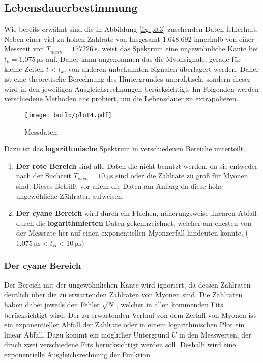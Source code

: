 \subsection{Lebensdauerbestimmung}
Wie bereits erwähnt sind die in Abbildung \eqref{fig:plt3} zusehenden Daten fehlerhaft. 
Neben einer viel zu hohen Zahlrate von Insgesamt $1.648.692$ innerhalb von einer Messzeit von $T_{mess}=\qty{157226}{\s}$,
weist das Spektrum eine ungewöhnliche Kante bei $t_k=\qty{1.075}{\us}$ auf.
Daher kann angenommen das die Myonsignale, gerade für kleine Zeiten $t<t_k$, von anderen unbekannten Signalen überlagert werden. 
Daher ist eine theoretische Berechnung des Hintergrundes unpraktisch, sondern dieser wird in den jeweiligen Ausgleichsrechnungen berücksichtigt. 
Im Folgenden werden verschiedene Methoden aus probiert, um die Lebensdauer zu extrapolieren. 
 
\begin{figure}[H]
	\centering
	\texttt{[image: build/plot4.pdf]}
	\caption{Messdaten}\label{fig:plt4}
\end{figure}

Dazu ist das \textbf{logarithmische} Spektrum in verschiedenen Bereiche unterteilt. 

\begin{enumerate}
	\item \textbf{Der rote Bereich} sind alle Daten die nicht benutzt werden, da sie entweder nach der Suchzeit $T_{such}=\qty{10}{\us}$ sind 
	oder die Zählrate zu groß für Myonen sind. Dieses Betrifft vor allem die Daten am Anfang da diese hohe ungewöhliche Zählraten aufweisen.
	\item \textbf{Der cyane Bereich} wird durch ein Flachen, näherungsweise linearen Abfall durch die \textbf{logarithmierten} Daten gekennzeichnet, 
	welcher am ehesten von der Messrate her auf einen exponentiellen Myonzerfall hindeuten könnte. ($\qty{1.075}{\us}<t_B<\qty{10}{\us}$)
\end{enumerate}

\subsubsection{Der cyane Bereich}
Der Bereich mit der ungewöhnlichen Kante wird ignoriert, da dessen Zählraten deutlich über die zu erwartenden Zahlraten von Myonen sind. 
Die Zählraten haben dabei jeweils den Fehler $\sqrt{N\,}$, welcher in allen kommenden Fits berücksichtigt wird. 
Der zu erwartenden Verlauf von dem Zerfall von Myonen ist ein exponentieller Abfall der Zahlrate oder in einem logarithmischen Plot ein linear Abfall. 
Dazu kommt ein möglicher Untergrund $U$ in den Messwerten, der druch zwei verschiedene Fits berücksichtigt werden soll. 
Deshalb wird eine exponentielle Ausgleichsrechnung der Funktion 

